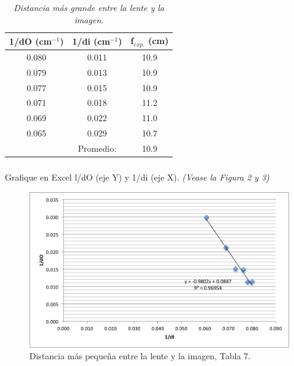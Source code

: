 \documentclass{article}
\begin{document}
\begin{table}[h!]
\begin{center}
\begin{tabular}{ |c|c|c| } 
 \hline
 1/dO (cm$^{-1}$) & 1/di (cm$^{-1}$) & f$_{exp.}$ (cm)\\ 
 \hline
 0.080  & 0.011  &	10.9\\ 
 0.079  & 0.013	 &	10.9\\ 
 0.077  & 0.015	 &	10.9\\
 0.071  & 0.018	 &	11.2\\
 0.069  & 0.022	 &	11.0\\
 0.065  & 0.029	 & 	10.7\\
 \hline
  & Promedio: & 10.9 \\ 
 \hline
\end{tabular}
\caption{ \emph{Distancia más grande entre la lente y la imagen.}}
\label{table:1}
\end{center}
\end{table}


\subsubsection{}
Grafique en Excel l/dO (eje Y) y 1/di (eje X). \emph{(Vease la Figura 2 y 3)}

\begin{center}
\begin{figure}[!ht]
    \centering
    \includegraphics[width=1\textwidth]{2.png}
    \caption{Distancia más pequeña entre la lente y la imagen, Tabla 7.}
    \label{fig:my_label}
\end{figure}
\end{center}
\end{document}
